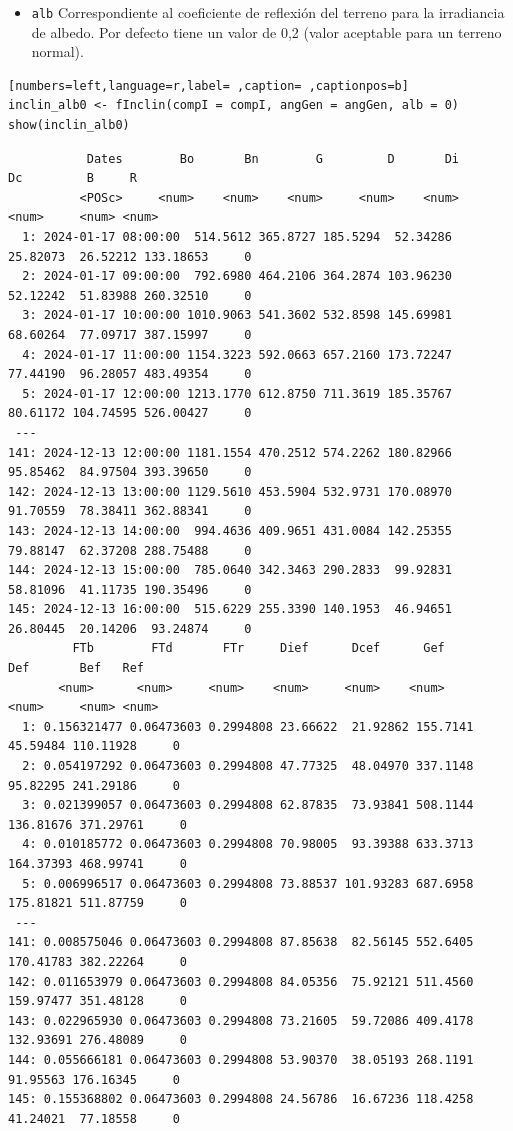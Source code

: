 \begin{itemize}
\begin{itemize}
\item \texttt{alb} Correspondiente al coeficiente de reflexión del terreno para la irradiancia de albedo. Por defecto tiene un valor de 0,2 (valor aceptable para un terreno normal).
\end{itemize}
\begin{lstlisting}[numbers=left,language=r,label= ,caption= ,captionpos=b]
inclin_alb0 <- fInclin(compI = compI, angGen = angGen, alb = 0)
show(inclin_alb0)
\end{lstlisting}

\begin{verbatim}
		   Dates        Bo       Bn        G         D       Di        Dc         B     R
		  <POSc>     <num>    <num>    <num>     <num>    <num>     <num>     <num> <num>
  1: 2024-01-17 08:00:00  514.5612 365.8727 185.5294  52.34286 25.82073  26.52212 133.18653     0
  2: 2024-01-17 09:00:00  792.6980 464.2106 364.2874 103.96230 52.12242  51.83988 260.32510     0
  3: 2024-01-17 10:00:00 1010.9063 541.3602 532.8598 145.69981 68.60264  77.09717 387.15997     0
  4: 2024-01-17 11:00:00 1154.3223 592.0663 657.2160 173.72247 77.44190  96.28057 483.49354     0
  5: 2024-01-17 12:00:00 1213.1770 612.8750 711.3619 185.35767 80.61172 104.74595 526.00427     0
 ---                                                                                             
141: 2024-12-13 12:00:00 1181.1554 470.2512 574.2262 180.82966 95.85462  84.97504 393.39650     0
142: 2024-12-13 13:00:00 1129.5610 453.5904 532.9731 170.08970 91.70559  78.38411 362.88341     0
143: 2024-12-13 14:00:00  994.4636 409.9651 431.0084 142.25355 79.88147  62.37208 288.75488     0
144: 2024-12-13 15:00:00  785.0640 342.3463 290.2833  99.92831 58.81096  41.11735 190.35496     0
145: 2024-12-13 16:00:00  515.6229 255.3390 140.1953  46.94651 26.80445  20.14206  93.24874     0
	     FTb        FTd       FTr     Dief      Dcef      Gef       Def       Bef   Ref
	   <num>      <num>     <num>    <num>     <num>    <num>     <num>     <num> <num>
  1: 0.156321477 0.06473603 0.2994808 23.66622  21.92862 155.7141  45.59484 110.11928     0
  2: 0.054197292 0.06473603 0.2994808 47.77325  48.04970 337.1148  95.82295 241.29186     0
  3: 0.021399057 0.06473603 0.2994808 62.87835  73.93841 508.1144 136.81676 371.29761     0
  4: 0.010185772 0.06473603 0.2994808 70.98005  93.39388 633.3713 164.37393 468.99741     0
  5: 0.006996517 0.06473603 0.2994808 73.88537 101.93283 687.6958 175.81821 511.87759     0
 ---                                                                                       
141: 0.008575046 0.06473603 0.2994808 87.85638  82.56145 552.6405 170.41783 382.22264     0
142: 0.011653979 0.06473603 0.2994808 84.05356  75.92121 511.4560 159.97477 351.48128     0
143: 0.022965930 0.06473603 0.2994808 73.21605  59.72086 409.4178 132.93691 276.48089     0
144: 0.055666181 0.06473603 0.2994808 53.90370  38.05193 268.1191  91.95563 176.16345     0
145: 0.155368802 0.06473603 0.2994808 24.56786  16.67236 118.4258  41.24021  77.18558     0
\end{verbatim}


\end{itemize}
